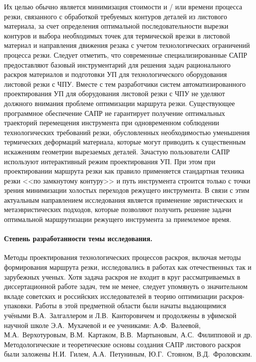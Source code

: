 Их целью обычно является минимизация стоимости и / или времени процесса резки,
связанного с обработкой требуемых контуров деталей из листового материала,
за счет определения оптимальной последовательности вырезки контуров
и выбора необходимых точек для термической врезки в листовой материал
и направления движения резака
с учетом технологических ограничений процесса резки.
Следует отметить, что современные специализированные САПР предоставляют
базовый инструментарий для решения задач рационального раскроя материалов
и подготовки УП для технологического оборудования листовой резки с ЧПУ.
Вместе с тем разработчики систем автоматизированного проектирования УП
для оборудования листовой резки с ЧПУ не уделяют должного внимания
проблеме оптимизации маршрута резки.
Существующее программное обеспечение САПР не гарантирует
получение оптимальных траекторий перемещения инструмента
при одновременном соблюдении технологических требований резки,
обусловленных необходимостью уменьшения термических деформаций материала,
которые могут приводить к существенным искажениям геометрии вырезаемых деталей.
Зачастую пользователи САПР используют интерактивный режим проектирования УП.
При этом при проектировании маршрута резки как правило применяется
стандартная техника резки <<по замкнутому контуру>> и путь инструмента строится
только с точки зрения минимизации холостых переходов режущего инструмента.
В связи с этим актуальным направлением
исследования является применение эвристических и метаэвристических подходов,
которые позволяют получить решение задачи
оптимальной маршрутизации
режущего инструмента
за приемлемое время.

\paragraph*{Степень разработанности темы исследования.}

Методы проектирования технологических процессов раскроя,
включая методы формирования маршрута резки, исследовались в работах как отечественных так и зарубежных ученых.
Хотя задача раскроя не входит в круг рассматриваемых в диссертационной работе задач,
тем не менее, следует упомянуть о значительном вкладе советских и российских исследователей
в теорию оптимизации раскроя-упаковки.
Работы в этой предметной области были начаты выдающимися учёными
В.А.~Залгаллером и Л.В.~Канторовичем
и продолжены в уфимской научной школе
Э.А.~Мухачевой и ее учениками:
А.Ф.~Валеевой, М.А.~Верхотуровым, В.М.~Картаком, В.В.~Мартыновым, А.С.~Филипповой и др.
Методологические и теоретические основы создания САПР листового раскроя были заложены
Н.И.~Гилем, А.А.~Петуниным, Ю.Г.~Стояном, В.Д.~Фроловским.

